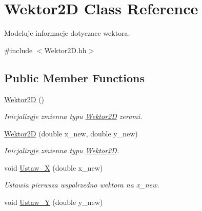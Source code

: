 \hypertarget{class_wektor2_d}{\section{Wektor2\+D Class Reference}
\label{class_wektor2_d}
}


Modeluje informacje dotyczace wektora.  




{\ttfamily \#include $<$Wektor2\+D.\+hh$>$}

\subsection*{Public Member Functions}
\begin{DoxyCompactItemize}
\item 
\hypertarget{class_wektor2_d_a0033c26592fddb39e1ae856f1356934c}{\hyperlink{class_wektor2_d_a0033c26592fddb39e1ae856f1356934c}{Wektor2\+D} ()}\label{class_wektor2_d_a0033c26592fddb39e1ae856f1356934c}

\begin{DoxyCompactList}\small\item\em Inicjalizyje zmienna typu \hyperlink{class_wektor2_d}{Wektor2\+D} zerami. \end{DoxyCompactList}\item 
\hyperlink{class_wektor2_d_a731c3a68d9c7d209cc4d130e7d26b488}{Wektor2\+D} (double x\+\_\+new, double y\+\_\+new)
\begin{DoxyCompactList}\small\item\em Inicjalizyje zmienna typu \hyperlink{class_wektor2_d}{Wektor2\+D}. \end{DoxyCompactList}\item 
\hypertarget{class_wektor2_d_a1335fe5aa19f0d521a0c87857ba42f65}{void \hyperlink{class_wektor2_d_a1335fe5aa19f0d521a0c87857ba42f65}{Ustaw\+\_\+\+X} (double x\+\_\+new)}\label{class_wektor2_d_a1335fe5aa19f0d521a0c87857ba42f65}

\begin{DoxyCompactList}\small\item\em Ustawia pierwsza wspolrzedno wektora na x\+\_\+new. \end{DoxyCompactList}\item 
\hypertarget{class_wektor2_d_aa94255dc07581b89f76145869d8619db}{void \hyperlink{class_wektor2_d_aa94255dc07581b89f76145869d8619db}{Ustaw\+\_\+\+Y} (double y\+\_\+new)}\label{class_wektor2_d_aa94255dc07581b89f76145869d8619db}


\end{DoxyCompactItemize}

